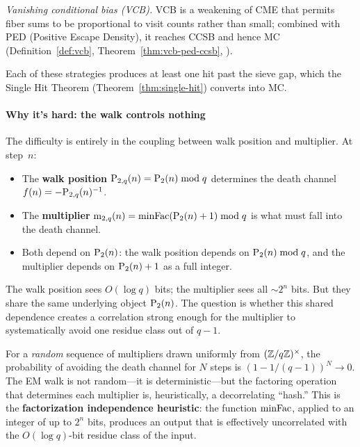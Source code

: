 \smallskip\noindent\emph{Vanishing conditional bias (VCB).}\enspace
VCB is a weakening of CME that permits fiber sums to be proportional
to visit counts rather than small; combined with PED (Positive
Escape Density), it reaches CCSB and hence MC
(Definition~\ref{def:vcb}, Theorem~\ref{thm:vcb-ped-ccsb},
).

\smallskip
Each of these strategies produces at least one hit past the sieve gap,
which the Single Hit Theorem (Theorem~\ref{thm:single-hit}) converts
into MC\@.

\paragraph{Why it's hard: the walk controls nothing}

The difficulty is entirely in the coupling between walk position and
multiplier.  At step~$n$:

\begin{itemize}[nosep]
\item The \textbf{walk position} $\mathrm{P}_{2,q}(n) = \mathrm{P}_{2}(n) \bmod q$
  determines the death channel $f(n) = -\mathrm{P}_{2,q}(n)^{-1}$.
\item The \textbf{multiplier}
  $\mathrm{m}_{2,q}(n) = \mathrm{minFac}(\mathrm{P}_{2}(n)+1) \bmod q$ is what must fall
  into the death channel.
\item Both depend on $\mathrm{P}_{2}(n)$: the walk position depends on
  $\mathrm{P}_{2}(n) \bmod q$, and the multiplier depends on $\mathrm{P}_{2}(n)+1$ as
  a full integer.
\end{itemize}

The walk position sees $O(\log q)$ bits; the multiplier sees all
$\sim 2^n$ bits.  But they share the same underlying object
$\mathrm{P}_{2}(n)$.  The question is whether this shared dependence creates a
correlation strong enough for the multiplier to systematically avoid
one residue class out of $q-1$.

For a \emph{random} sequence of multipliers drawn uniformly from
$(\mathbb{Z}/q\mathbb{Z})^\times$, the probability of avoiding the death channel
for $N$ steps is $(1 - 1/(q-1))^N \to 0$.  The EM walk is not
random---it is deterministic---but the factoring operation that
determines each multiplier is, heuristically, a decorrelating ``hash.''
This is the \textbf{factorization independence heuristic}: the
function $\mathrm{minFac}$, applied to an integer of up to $2^n$ bits, produces an
output that is effectively uncorrelated with the $O(\log q)$-bit
residue class of the input.

